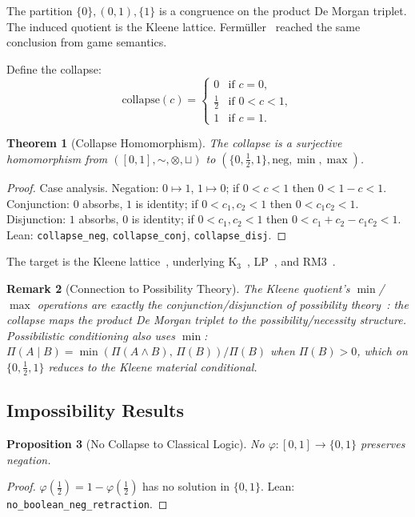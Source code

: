 \documentclass[11pt,a4paper]{article}
\newtheorem{theorem}{Theorem}[section]
\newtheorem{proposition}[theorem]{Proposition}
\newtheorem{remark}[theorem]{Remark}
\newcommand{\negc}{\mathord{\sim}}
\newcommand{\conjc}{\otimes}
\newcommand{\disjc}{\sqcup}
\begin{document}
The partition $\{0\}, (0,1), \{1\}$ is a congruence on the product De Morgan
triplet.
The induced quotient is the Kleene lattice.
Ferm\"uller~\cite{fermuller2014} reached the same conclusion from game
semantics.

Define the collapse:
\[
\text{collapse}(c) = \begin{cases}
0 & \text{if } c = 0, \\
\tfrac{1}{2} & \text{if } 0 < c < 1, \\
1 & \text{if } c = 1.
\end{cases}
\]

\begin{theorem}[Collapse Homomorphism]
\label{thm:collapse}
The collapse is a surjective homomorphism from
$([0,1], \negc, \conjc, \disjc)$ to
$(\{0, \tfrac{1}{2}, 1\}, \mathrm{neg}, \min, \max)$.
\end{theorem}
\begin{proof}
Case analysis.
Negation: $0 \mapsto 1$, $1 \mapsto 0$; if $0 < c < 1$ then
$0 < 1-c < 1$.
Conjunction: $0$ absorbs, $1$ is identity; if $0 < c_1, c_2 < 1$ then
$0 < c_1 c_2 < 1$.
Disjunction: $1$ absorbs, $0$ is identity; if $0 < c_1, c_2 < 1$ then
$0 < c_1 + c_2 - c_1 c_2 < 1$.
Lean: \texttt{collapse\_neg}, \texttt{collapse\_conj},
\texttt{collapse\_disj}.
\end{proof}

The target is the Kleene lattice~\cite{kleene1952}, underlying
K$_3$~\cite{kleene1952}, LP~\cite{priest1979}, and
RM3~\cite{meyer1972}.

\begin{remark}[Connection to Possibility Theory]
\label{rem:possibility}
The Kleene quotient's $\min$/$\max$ operations are exactly the
conjunction/disjunction of possibility theory~\cite{dubois1988}:
the collapse maps the product De Morgan triplet to the
possibility/necessity structure.
Possibilistic conditioning also uses $\min$: $\Pi(A \mid B) =
\min(\Pi(A \land B),\, \Pi(B)) / \Pi(B)$ when $\Pi(B) > 0$, which
on $\{0, \tfrac{1}{2}, 1\}$ reduces to the Kleene material conditional.
\end{remark}

\subsection{Impossibility Results}

\begin{proposition}[No Collapse to Classical Logic]
\label{prop:no-classical}
No $\varphi : [0,1] \to \{0,1\}$ preserves negation.
\end{proposition}
\begin{proof}
$\varphi(\tfrac{1}{2}) = 1 - \varphi(\tfrac{1}{2})$ has no solution
in $\{0, 1\}$.
Lean: \texttt{no\_boolean\_neg\_retraction}.
\end{proof}
\end{document}
